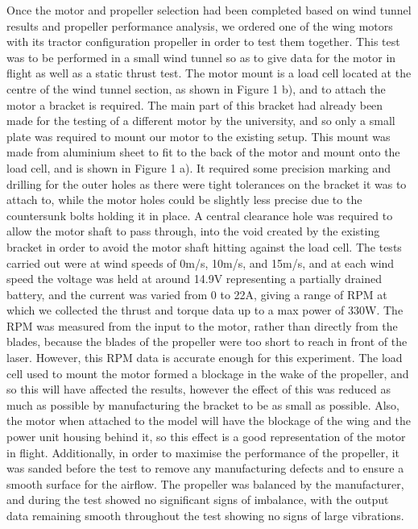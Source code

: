 \documentclass[../../main.tex]{subfiles}
\begin{document}
Once the motor and propeller selection had been completed based on wind tunnel results and propeller performance analysis, we ordered one of the wing motors with its tractor configuration propeller in order to test them together.
This test was to be performed in a small wind tunnel so as to give data for the motor in flight as well as a static thrust test.
The motor mount is a load cell located at the centre of the wind tunnel section, as shown in Figure 1 b), and to attach the motor a bracket is required.
The main part of this bracket had already been made for the testing of a different motor by the university, and so only a small plate was required to mount our motor to the existing setup.
This mount was made from aluminium sheet to fit to the back of the motor and mount onto the load cell, and is shown in Figure 1 a).
It required some precision marking and drilling for the outer holes as there were tight tolerances on the bracket it was to attach to, while the motor holes could be slightly less precise due to the countersunk bolts holding it in place.
A central clearance hole was required to allow the motor shaft to pass through, into the void created by the existing bracket in order to avoid the motor shaft hitting against the load cell.
The tests carried out were at wind speeds of 0m/s, 10m/s, and 15m/s, and at each wind speed the voltage was held at around 14.9V representing a partially drained battery, and the current was varied from 0 to 22A, giving a range of RPM at which we collected the thrust and torque data up to a max power of 330W.
The RPM was measured from the input to the motor, rather than directly from the blades, because the blades of the propeller were too short to reach in front of the laser.
However, this RPM data is accurate enough for this experiment.
The load cell used to mount the motor formed a blockage in the wake of the propeller, and so this will have affected the results, however the effect of this was reduced as much as possible by manufacturing the bracket to be as small as possible.
Also, the motor when attached to the model will have the blockage of the wing and the power unit housing behind it, so this effect is a good representation of the motor in flight.
Additionally, in order to maximise the performance of the propeller, it was sanded before the test to remove any manufacturing defects and to ensure a smooth surface for the airflow.
The propeller was balanced by the manufacturer, and during the test showed no significant signs of imbalance, with the output data remaining smooth throughout the test showing no signs of large vibrations. 
\end{document}
